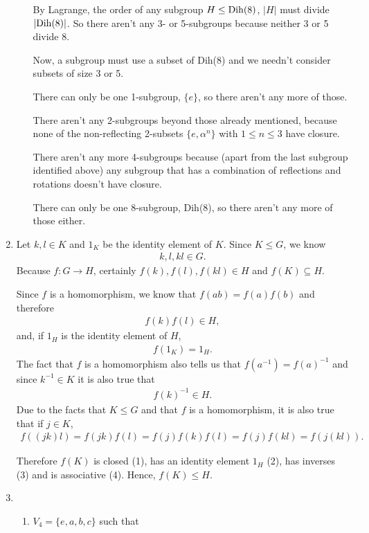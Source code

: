 \documentclass[10pt]{article}
\begin{document}
\begin{enumerate}
\begin{enumerate}
        By Lagrange, the order of any subgroup $H \leq {\rm Dih}(8)$, $|H|$
        must divide $|{\rm Dih}(8)|$. So there aren't any 3- or 5-subgroups
        because neither 3 or 5 divide 8.

        Now, a subgroup must use a subset of Dih(8) and we needn't consider
        subsets of size 3 or 5.

        There can only be one 1-subgroup, $\{e\}$, so there aren't any more of
        those.

        There aren't any 2-subgroups beyond those already mentioned, because
        none of the non-reflecting 2-subsets $\{e, \alpha^n\}$ with $1 \leq n
        \leq 3$ have closure.

        There aren't any more 4-subgroups because (apart from the last subgroup
        identified above) any subgroup that has a combination of reflections
        and rotations doesn't have closure.

        There can only be one 8-subgroup, Dih(8), so there aren't any more of
        those either.
    \end{enumerate}
  \item Let $k, l \in K$ and $1_K$ be the identity element of $K$.
    Since $K \leq G$, we know
    \begin{align*}
      k, l, kl \in G.
    \end{align*}
    Because $f : G \rightarrow H$, certainly 
      $f(k), f(l), f(kl) \in H$ and $f(K) \subseteq H$.

    Since $f$ is a homomorphism, we know that $f(ab) = f(a)f(b)$ and therefore
    \begin{align}
      f(k)f(l) \in H,
    \end{align}
    and, if $1_H$ is the identity element of $H$,
    \begin{align}
      f(1_K) = 1_H.
    \end{align}
          The fact that $f$ is a homomorphism also tells us that $f(a^{-1}) =
          f(a)^{-1}$ and since $k^{-1} \in K$ it is also true that
    \begin{align}
      f(k)^{-1} \in H.
    \end{align}
    Due to the facts that $K \leq G$ and that $f$ is a homomorphism, it is also
    true that if $j \in K$,
      \begin{align}
        f((jk)l) = f(jk)f(l) = f(j)f(k)f(l) = f(j)f(kl) = f(j(kl)).
      \end{align}

      Therefore $f(K)$ is closed (1), has an identity element $1_H$ (2), has
      inverses (3) and is associative (4). Hence, $f(K) \leq H$.
    \item 
      \begin{enumerate}
        \item $V_4 = \{e, a, b, c\}$ such that


\end{enumerate}
\end{enumerate}
\end{document}
